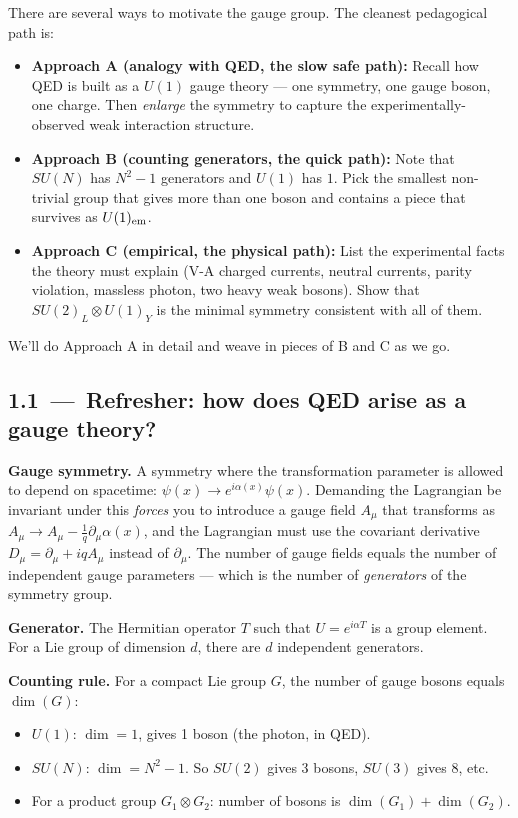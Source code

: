 \documentclass[11pt]{article}
\begin{document}
\begin{strategybox}
There are several ways to motivate the gauge group. The cleanest pedagogical path is:
\begin{itemize}[leftmargin=*]
  \item \textbf{Approach A (analogy with QED, the slow safe path):} Recall how QED is built
        as a $U(1)$ gauge theory --- one symmetry, one gauge boson, one charge. Then
        \emph{enlarge} the symmetry to capture the experimentally-observed weak interaction
        structure.
  \item \textbf{Approach B (counting generators, the quick path):} Note that $SU(N)$ has
        $N^2-1$ generators and $U(1)$ has $1$. Pick the smallest non-trivial group that
        gives more than one boson and contains a piece that survives as $U(1)_{\rm em}$.
  \item \textbf{Approach C (empirical, the physical path):} List the experimental facts the
        theory must explain (V-A charged currents, neutral currents, parity violation,
        massless photon, two heavy weak bosons). Show that $SU(2)_L \otimes U(1)_Y$ is the
        minimal symmetry consistent with all of them.
\end{itemize}
We'll do Approach A in detail and weave in pieces of B and C as we go.
\end{strategybox}

\subsection*{1.1 \,---\, Refresher: how does QED arise as a gauge theory?}

\begin{termbox}
\textbf{Gauge symmetry.} A symmetry where the transformation parameter is allowed to depend
on spacetime: $\psi(x) \to e^{i\alpha(x)} \psi(x)$. Demanding the Lagrangian be invariant
under this \emph{forces} you to introduce a gauge field $A_\mu$ that transforms as
$A_\mu \to A_\mu - \tfrac{1}{q}\partial_\mu \alpha(x)$, and the Lagrangian must use the
covariant derivative $D_\mu = \partial_\mu + iq A_\mu$ instead of $\partial_\mu$.
The number of gauge fields equals the number of independent gauge parameters --- which is
the number of \emph{generators} of the symmetry group.

\textbf{Generator.} The Hermitian operator $T$ such that $U = e^{i \alpha T}$ is a group
element. For a Lie group of dimension $d$, there are $d$ independent generators.

\textbf{Counting rule.} For a compact Lie group $G$, the number of gauge bosons equals
$\dim(G)$:
\begin{itemize}[leftmargin=*]
  \item $U(1)$: $\dim = 1$, gives 1 boson (the photon, in QED).
  \item $SU(N)$: $\dim = N^2-1$. So $SU(2)$ gives 3 bosons, $SU(3)$ gives 8, etc.
  \item For a product group $G_1 \otimes G_2$: number of bosons is $\dim(G_1) + \dim(G_2)$.
\end{itemize}
\end{termbox}
\end{document}
